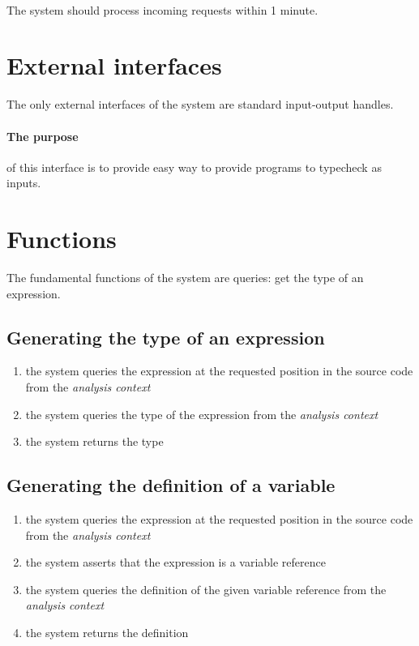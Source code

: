 \documentclass[12pt]{article}
\newcounter{req}
\newcommand{\req}[1][]{\refstepcounter{req}\label{req:#1}\paragraph{\fbox{\textsf{\textsc{REQ}-\thereq}}}}
\begin{document}
\req The system should process incoming requests within 1 minute.

\section{External interfaces}

The only external interfaces of the system are standard input-output handles.

\paragraph{The purpose} of this interface is to provide easy way to provide programs to typecheck as inputs.

\section{Functions}

The fundamental functions of the system are queries: get the type of an expression.

\subsection{Generating the type of an expression}

\begin{enumerate}
  \item the system queries the expression at the requested position in the source code from the \emph{analysis context}
  \item the system queries the type of the expression from the \emph{analysis context}
  \item the system returns the type
\end{enumerate}

\subsection{Generating the definition of a variable}

\begin{enumerate}
  \item the system queries the expression at the requested position in the source code from the \emph{analysis context}
  \item the system asserts that the expression is a variable reference
  \item the system queries the definition of the given variable reference from the \emph{analysis context}
  \item the system returns the definition
\end{enumerate}
\end{document}
